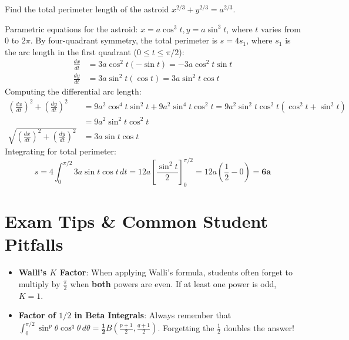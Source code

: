 \begin{example}
Find the total perimeter length of the astroid $x^{2/3} + y^{2/3} = a^{2/3}$.
\end{example}

\begin{solutionbox}
Parametric equations for the astroid: $x = a\cos^3 t, y = a\sin^3 t$, where $t$ varies from $0$ to $2\pi$.
By four-quadrant symmetry, the total perimeter is $s = 4 s_1$, where $s_1$ is the arc length in the first quadrant ($0 \le t \le \pi/2$):
\begin{align*}
    \frac{dx}{dt} &= 3a\cos^2 t (-\sin t) = -3a\cos^2 t \sin t \\
    \frac{dy}{dt} &= 3a\sin^2 t (\cos t) = 3a\sin^2 t \cos t
\end{align*}
Computing the differential arc length:
\begin{align*}
    \left(\frac{dx}{dt}\right)^2 + \left(\frac{dy}{dt}\right)^2 &= 9a^2 \cos^4 t \sin^2 t + 9a^2 \sin^4 t \cos^2 t = 9a^2 \sin^2 t \cos^2 t (\cos^2 t + \sin^2 t) \\
    &= 9a^2 \sin^2 t \cos^2 t \\
    \sqrt{\left(\frac{dx}{dt}\right)^2 + \left(\frac{dy}{dt}\right)^2} &= 3a \sin t \cos t
\end{align*}
Integrating for total perimeter:
\begin{equation*}
    s = 4 \int_0^{\pi/2} 3a \sin t \cos t\,dt = 12a \left[ \frac{\sin^2 t}{2} \right]_0^{\pi/2} = 12a \left(\frac{1}{2} - 0\right) = \mathbf{6a}
\end{equation*}
\end{solutionbox}

\section{Exam Tips \& Common Student Pitfalls}

\begin{examtip}
\begin{itemize}
    \item \textbf{Walli's $K$ Factor}: When applying Walli's formula, students often forget to multiply by $\frac{\pi}{2}$ when \textbf{both} powers are even. If at least one power is odd, $K = 1$.
    \item \textbf{Factor of $1/2$ in Beta Integrals}: Always remember that $\int_0^{\pi/2} \sin^p\theta \cos^q\theta\,d\theta = \mathbf{\frac{1}{2}} B\left(\frac{p+1}{2}, \frac{q+1}{2}\right)$. Forgetting the $\frac{1}{2}$ doubles the answer!
\end{itemize}
\end{examtip}

